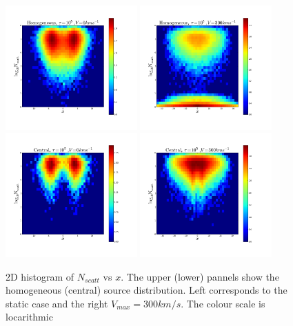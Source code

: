 \documentclass[usenatbib]{mn2e}
\begin{document}
\begin{figure}
     \includegraphics[width=0.45\textwidth]{2dHistogram0t5HOM.png}
     \includegraphics[width=0.45\textwidth]{2dHistogram300t5HOM.png} 
     \includegraphics[width=0.45\textwidth]{2dHistogram0t5.png}
     \includegraphics[width=0.45\textwidth]{2dHistogram300t5.png}    

    \caption{2D histogram of $N_{scatt}$ vs $x$. The upper (lower) pannels
      show the homogeneous (central) source distribution. Left
      corresponds to the static case and the right
      $V_{max}=300km/s$. The colour scale is locarithmic\label{fig:Nscatt2D}}  
\end{figure}
\end{document}
